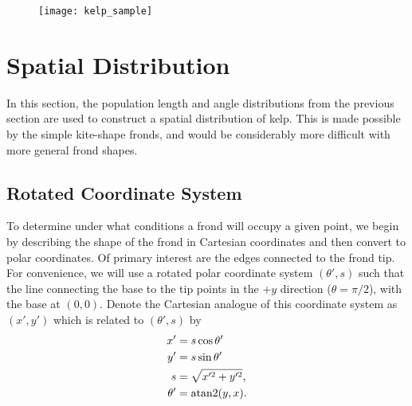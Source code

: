 \begin{figure}[h]
	\centering
	\texttt{[image: kelp\_sample]}
	\label{fig:kelp_sample}
\end{figure}

\section{Spatial Distribution}
In this section, the population length and angle distributions from the previous section are used to construct a spatial distribution of kelp.
This is made possible by the simple kite-shape fronds, and would be considerably more difficult with more general frond shapes.
\subsection{Rotated Coordinate System}
\label{sec:rot_coords}
To determine under what conditions a frond will occupy a given point, we begin by
describing the shape of the frond in Cartesian coordinates and then convert to polar coordinates.
Of primary interest are the edges connected to the frond tip.
For convenience, we will use a rotated polar coordinate system $(\theta',s)$ such that the line connecting the base to the tip points in the $+y$ direction ($\theta=\pi/2$), with the base at $(0,0)$.
Denote the Cartesian analogue of this coordinate system as $(x',y')$ which is related to $(\theta',s)$ by
\begin{align*}
	x' &= s\cos\theta' \\
	y' &= s\sin\theta' \\
	s &= \sqrt{x'^2+y'^2}, \\
	\theta' &= \operatorname{atan2}(y, x).
\end{align*}

